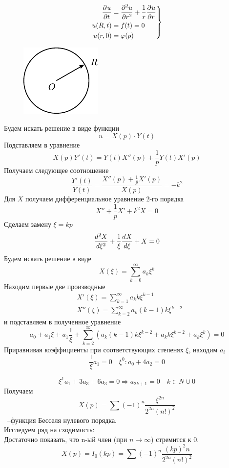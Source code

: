 \[
	\left.\begin{aligned}
		\frac{\partial^{}u}{\partial t^{}} &= \frac{\partial^{2}u}{\partial r^{2}} +\frac{1}{r} \frac{\partial^{}u}{\partial r^{}}\\
		u(R, t) &= f(t)= 0\\
		u(r, 0) &= \varphi(p)	
	\end{aligned}\right\}
\]
\begin{figure} 
	\centering
	\includegraphics{figWarm1.pdf}		
\end{figure}
Будем искать решение в виде функции 
\[
	u = X(p)\cdot Y(t)
\]
Подставляем в уравнение
\[ 
	X(p)Y'(t) = Y(t) X''(p) +\frac{1}{p} Y(t) X'(p)
\]
Получаем следующее соотношение
\[
	\frac{Y'(t)}{Y(t)} = \frac{X''(p) + \frac{1}{p} X'(p)}{X(p)} = - k^2
\]
Для $X$ получаем дифференциальное уравнение 2-го порядка
\[
	X'' + \frac{1}{p} X' +k^2 X = 0
\]
Сделаем замену $\xi = k p$
\[
	  \frac{d^{2}X}{d\xi^{2}} + \frac{1}{\xi} \frac{d^{}X}{d\xi^{}} + X = 0
\]
Будем искать решение в виде 
\[
	X(\xi) = \sum\limits_{k = 0}^{\infty} a_k \xi^k
\]
Находим первые две производные
\begin{align*}
	&X'(\xi)= \sum\limits_{k = 1}^{\infty} a_k k \xi^{k - 1}\\
	&X''(\xi) =  \sum\limits_{k = 2}^{\infty} a_k (k - 1) k \xi^{k - 2}
\end{align*}
и подставляем в полученное уравнение 
\[
	a_0 + a_1 \xi + a_1 \frac{1}{\xi} + \sum\limits_{k = 2}^{\infty} (a_k (k - 1) k \xi^{k - 2} + a_k k \xi^{k - 2} + a_k \xi^k) = 0 
\]
Приравнивая коэффициенты при соответствующих степенях $\xi$, находим $a_i$
\[
	\frac{1}{\xi} a_1 = 0 \quad \xi^0: a_0 + 4 a_2 = 0
\]

\[
	\xi^1 a_1 + 3 a_3 + 6 a_3 = 0 \Rightarrow  a_{2k + 1} = 0 \quad k \in N \cup {0}
\]
Получаем
\[
	X(p) = \sum (-1)^n \frac{\xi^{2n}}{2^{2n} (n!)^2}
\]~--функция Бесселя нулевого порядка.\\

Исследуем ряд на сходимость:\\
Достаточно показать, что n-ый член (при $n \rightarrow \infty$) стремится к 0.\\
	\[X(p) = I_0 (k p) = \sum (-1)^n \frac{(k p)^2n}{2^{2n} (n!)^2}\]

